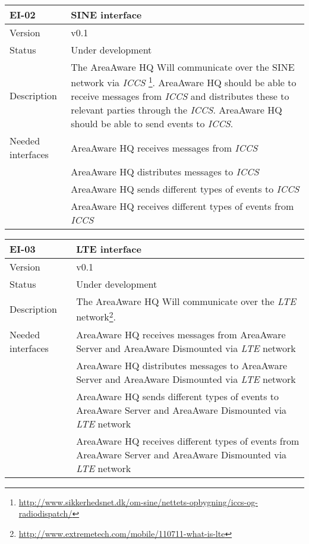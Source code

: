 \begin{longtable}{| p{3.5cm} |  p{10cm} | }
	\hline
	\textbf{EI-02} &  \textbf{SINE interface} \\
	\hline
	Version & v0.1 \\
	\hline
	Status & Under development \\
	\hline
	Description & The AreaAware HQ Will communicate over the SINE network via \emph{ICCS} \footnote{\url{http://www.sikkerhedsnet.dk/om-sine/nettets-opbygning/iccs-og-radiodispatch/}}. AreaAware HQ should be able to receive messages from \emph{ICCS} and distributes these to relevant parties through the \emph{ICCS}. AreaAware HQ should be able to send events to \emph{ICCS}.
	\\
	\hline
	Needed interfaces 
	& AreaAware HQ receives messages from \emph{ICCS} \\
	& AreaAware HQ distributes messages to \emph{ICCS} \\
	& AreaAware HQ sends different types of events to \emph{ICCS} \\
	& AreaAware HQ receives different types of events from \emph{ICCS} \\
	\hline
\end{longtable}

\begin{longtable}{| p{3.5cm} |  p{10cm} | }
	\hline
	\textbf{EI-03} &  \textbf{LTE interface} \\
	\hline
	Version & v0.1 \\
	\hline
	Status & Under development \\
	\hline
	Description & The AreaAware HQ Will communicate over the \emph{LTE} network\footnote{\url{http://www.extremetech.com/mobile/110711-what-is-lte}}.
	\\
	\hline
	Needed interfaces 
	& AreaAware HQ receives messages from AreaAware Server and AreaAware Dismounted via \emph{LTE} network \\
	& AreaAware HQ distributes messages to AreaAware Server and AreaAware Dismounted via \emph{LTE} network \\ 
	& AreaAware HQ sends different types of events to AreaAware Server and AreaAware Dismounted via \emph{LTE} network \\
	& AreaAware HQ receives different types of events from AreaAware Server and AreaAware Dismounted via \emph{LTE} network \\
	\hline
\end{longtable}

